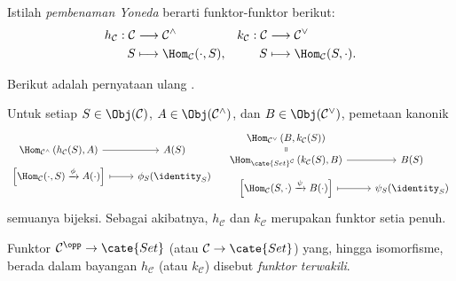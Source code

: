 Istilah \emph{pembenaman Yoneda} berarti funktor-funktor berikut:
\begin{align*}
	h_{\mathcal{C}}: \mathcal{C} & \longrightarrow \mathcal{C}^\wedge & k_{\mathcal{C}}: \mathcal{C} & \longrightarrow \mathcal{C}^\vee \\
	S & \longmapsto \Hom_{\mathcal{C}}(\cdot, S), & S & \longmapsto \Hom_{\mathcal{C}}(S, \cdot).
\end{align*}

Berikut adalah pernyataan ulang \cite[Teorema 2.5.1]{Li1}.

\begin{theorem}\label{prop:Yoneda}
	Untuk setiap $S\in\Obj(\mathcal{C})$,
	$A\in\Obj(\mathcal{C}^\wedge)$, dan
	$B\in\Obj(\mathcal{C}^\vee)$, pemetaan kanonik
	\[\begin{tikzcd}[row sep=tiny]
		\Hom_{\mathcal{C}^\wedge}\left(h_{\mathcal{C}}(S), A \right) \arrow[r] & A(S) \\
		{\left[ \Hom_{\mathcal{C}}(\cdot, S) \xrightarrow{\phi} A(\cdot) \right]} \arrow[mapsto, r] & \phi_S(\identity_S)
	\end{tikzcd} \quad \begin{tikzcd}[row sep=tiny]
		\Hom_{\mathcal{C}^\vee}\left(B, k_{\mathcal{C}}(S) \right) \arrow[equal, d] & \\
		\Hom_{\cate{Set}^{\mathcal{C}}}\left(k_{\mathcal{C}}(S), B \right) \arrow[r] & B(S) \\
		{\left[ \Hom_{\mathcal{C}}(S, \cdot) \xrightarrow{\psi} B(\cdot) \right]} \arrow[mapsto, r] & \psi_S(\identity_S)
	\end{tikzcd}\]
	semuanya bijeksi. Sebagai akibatnya, $h_{\mathcal{C}}$ dan
	$k_{\mathcal{C}}$ merupakan funktor setia penuh.
\end{theorem}

\begin{definition}\label{def:representable-functor}
	Funktor $\mathcal{C}^{\opp}\to\cate{Set}$ (atau
	$\mathcal{C}\to\cate{Set}$) yang, hingga isomorfisme, berada dalam
	bayangan $h_{\mathcal{C}}$ (atau $k_{\mathcal{C}}$) disebut
	\emph{funktor terwakili}.
\end{definition}

